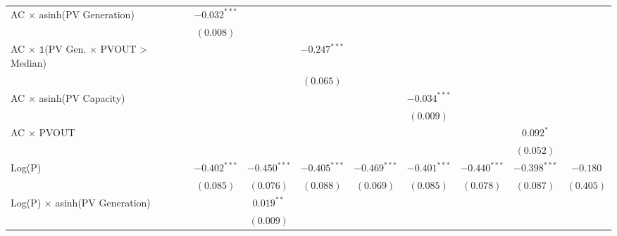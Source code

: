 \begin{table}[htbp]
\begin{center}
\begin{tabular}{l c c c c c c c c}
AC $\times$ asinh(PV Generation)                          & $-0.032^{***}$ &                &                &                &                &                &                &               \\
                                                          & $(0.008)$      &                &                &                &                &                &                &               \\
AC $\times$ $\mathds{1}$(PV Gen. $\times$ PVOUT > Median) &                &                & $-0.247^{***}$ &                &                &                &                &               \\
                                                          &                &                & $(0.065)$      &                &                &                &                &               \\
AC $\times$ asinh(PV Capacity)                            &                &                &                &                & $-0.034^{***}$ &                &                &               \\
                                                          &                &                &                &                & $(0.009)$      &                &                &               \\
AC $\times$ PVOUT                                         &                &                &                &                &                &                & $0.092^{*}$    &               \\
                                                          &                &                &                &                &                &                & $(0.052)$      &               \\
Log(P)                                                    & $-0.402^{***}$ & $-0.450^{***}$ & $-0.405^{***}$ & $-0.469^{***}$ & $-0.401^{***}$ & $-0.440^{***}$ & $-0.398^{***}$ & $-0.180$      \\
                                                          & $(0.085)$      & $(0.076)$      & $(0.088)$      & $(0.069)$      & $(0.085)$      & $(0.078)$      & $(0.087)$      & $(0.405)$     \\
Log(P) $\times$ asinh(PV Generation)                      &                & $0.019^{**}$   &                &                &                &                &                &               \\
                                                          &                & $(0.009)$      &                &                &                &                &                &               \\

\end{tabular}
\end{center}
\end{table}
